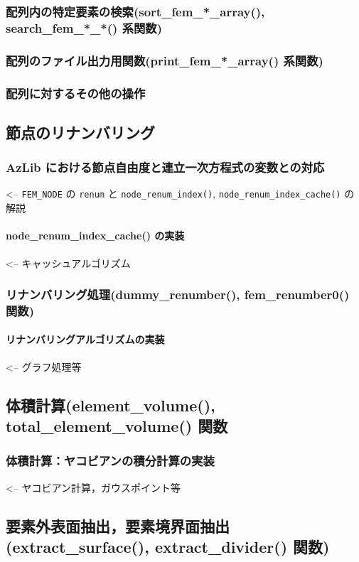 \documentclass[a4paper,10pt]{jarticle}
\begin{document}
\subsubsection{配列内の特定要素の検索(sort\_fem\_*\_array(), search\_fem\_*\_*() 系関数)}
\subsubsection{配列のファイル出力用関数(print\_fem\_*\_array() 系関数)}
\subsubsection{配列に対するその他の操作}

\subsection{節点のリナンバリング}
\subsubsection{AzLib における節点自由度と連立一次方程式の変数との対応}
  <-- \verb|FEM_NODE| の \verb|renum| と \verb|node_renum_index()|,
  \verb|node_renum_index_cache()| の解説
\paragraph{node\_renum\_index\_cache() の実装}  <-- キャッシュアルゴリズム
\subsubsection{リナンバリング処理(dummy\_renumber(), fem\_renumber0() 関数)}
\paragraph{リナンバリングアルゴリズムの実装}  <-- グラフ処理等

\subsection{体積計算(element\_volume(), total\_element\_volume() 関数}
\subsubsection{体積計算：ヤコビアンの積分計算の実装}
    <-- ヤコビアン計算，ガウスポイント等

\subsection{要素外表面抽出，要素境界面抽出(extract\_surface(), extract\_divider() 関数)}
\end{document}
